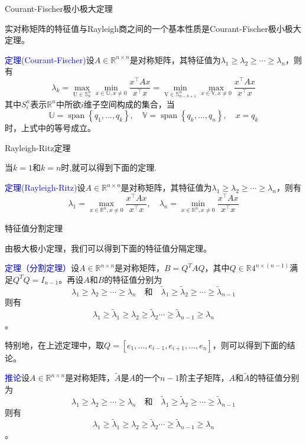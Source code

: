 \documentclass[12pt,a4paper]{article}
\begin{document}
Courant-Fischer极小极大定理

实对称矩阵的特征值与Rayleigh商之间的一个基本性质是Courant-Fischer极小极大定理。

\textcolor{blue}{定理(Courant-Fischer)}\quad 设$A \in \mathbb{R}^{n \times n}$是对称矩阵，其特征值为$\lambda_{1} \geq \lambda_{2} \geq \cdots \geq \lambda_{n}$，则有$$
\lambda_{k}=\max _{\mathrm{U} \in \mathbb{S}_{k}^{n}} \min _{x \in \mathbb{U}, x \neq 0} \frac{x^{\top} A x}{x^{\top} x}
=\min _{\mathrm{V} \in \mathbb{S}_{n-k+1}^{n}} \max _{x \in \mathbb{V}, x \neq 0} \frac{x^{\top} A x}{x^{\top} x}
$$
其中$S_{i}^{n}$表示$\mathbb{R}^{n}$中所欲$i$维子空间构成的集合，当$$
\mathbb{U}=\operatorname{span}\left\{q_{1}, \ldots, q_{k}\right\}, \quad \mathbb{V}=\operatorname{span}\left\{q_{k}, \ldots, q_{n}\right\}, \quad x=q_{k}
$$时，上式中的等号成立。

Rayleigh-Ritz定理

当$k= 1$和$k=n$时,就可以得到下面的定理.

\textcolor{blue}{定理(Rayleigh-Ritz)}\quad 设$A \in \mathbb{R}^{n \times n}$是对称矩阵，其特征值为$\lambda_{1} \geq \lambda_{2} \geq \cdots \geq \lambda_{n}$，则有$$
\lambda_{1}=\max _{x \in \mathbb{R}^{n}, x \neq 0} \frac{x^{\top} A x}{x^{\top} x}, \quad \lambda_{n}=\min _{x \in \mathbb{R}^{n}, x \neq 0} \frac{x^{\top} A x}{x^{\top} x}
$$

特征值分割定理

由极大极小定理，我们可以得到下面的特征值分隔定理。

\textcolor{blue}{定理（分割定理）}\quad 设$A \in \mathbb{R}^{n \times n}$是对称矩阵，$B=Q^TAQ$，其中$Q\in \mathbb{R}4^{n \times (n-1)}$满足$Q^TQ=I_{n-1}$。再设$A$和$B$的特征值分别为$$
\lambda_{1} \geq \lambda_{2} \geq \cdots \geq \lambda_{n} \quad \text{和}  \quad \tilde{\lambda}_{1} \geq \tilde{\lambda}_{2} \geq \cdots \geq \tilde{\lambda}_{n-1}
$$则有$$
\lambda_{1} \geq \tilde{\lambda}_{1} \geq \lambda_{2} \geq \tilde{\lambda}_{2} \cdots \geq \tilde{\lambda}_{n-1} \geq \lambda_{n}
$$。

特别地，在上述定理中，取$Q=\left[e_{1}, \ldots, e_{i-1}, e_{i+1}, \dots, e_{n}\right]$，则可以得到下面的结论。

\textcolor{blue}{推论}\quad 设$A \in \mathbb{R}^{n \times n}$是对称矩阵，$\tilde{A}$是$A$的一个$n-1$阶主子矩阵，$A$和$\tilde{A}$的特征值分别为$$
\lambda_{1} \geq \lambda_{2} \geq \cdots \geq \lambda_{n} \quad \text{和}  \quad \tilde{\lambda}_{1} \geq \tilde{\lambda}_{2} \geq \cdots \geq \tilde{\lambda}_{n-1}
$$则有$$
\lambda_{1} \geq \tilde{\lambda}_{1} \geq \lambda_{2} \geq \tilde{\lambda}_{2} \cdots \geq \tilde{\lambda}_{n-1} \geq \lambda_{n}
$$。
\end{document}

